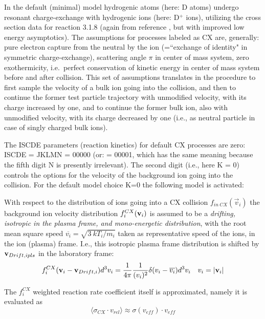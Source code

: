 In the default (minimal) model hydrogenic atoms (here: D atoms) undergo
resonant charge-exchange with hydrogenic ions (here: D$^+$ ions), utilizing the
cross section data for reaction 3.1.8 (again from reference \cite{kn:Janev},
but with improved low energy asymptotics).
The assumptions for processes labeled as CX are, generally: pure electron
capture from the neutral by the ion (=``exchange of identity" in symmetric
charge-exchange), scattering angle $\pi$ in center of mass system, zero
exothermicity, i.e.\ perfect conservation of kinetic energy in center of mass
system before and after collision.
This set of assumptions translates in the procedure to first sample the
velocity of a bulk ion going into the collision, and then to continue the
former test particle trajectory with unmodified velocity, with its charge
increased by one, and to continue the former bulk ion, also with unmodified
velocity, with its charge decreased by one (i.e., as neutral particle in case
of singly charged bulk ions).

The ISCDE parameters (reaction kinetics) for default CX processes are zero:
ISCDE = JKLMN = 00000 (or: = 00001, which has the same meaning because the
fifth digit N is presently irrelevant).
The second digit (i.e., here K = 0) controls the options for the velocity of
the background ion going into the collision.
For the default model choice K=0 the following model is activated:

With respect to the distribution of ions going into a CX collision
$f_{in \ CX}(\vec v_i)$ the background ion velocity distribution
$f_i^{CX}(\mathbf{v}_i)$ is assumed to be a \emph{drifting, isotropic in the plasma
frame, and mono-energetic distribution}, with the root mean square speed
$\overline{v_i} = \sqrt{3 ~ kT_i/m_i}$ taken as representative speed of the
ions, in the ion (plasma) frame.
I.e., this isotropic plasma frame distribution is shifted by $\mathbf{v}_{Drift,ipls}$
in the laboratory frame:
\begin{equation}
  \label{iso-mono}
  f_i^{CX}
  (\mathbf{v}_i-\mathbf{v}_{Drift,i})d^3v_i =
  \frac{1}{4\pi}\frac{1}{(v_i)^2}\delta(v_i-\overline{v_i})d^3v_i \quad  v_i =
  |\mathbf{v}_i|
\end{equation}

The $f_i^{CX}$ weighted reaction rate coefficient itself is approximated,
namely it is evaluated as
\begin{equation}
  \label{sigveff} \langle\sigma_{CX}
  \cdot v_{rel}\rangle \approx \sigma(v_{eff}) \cdot v_{eff}
\end{equation}

